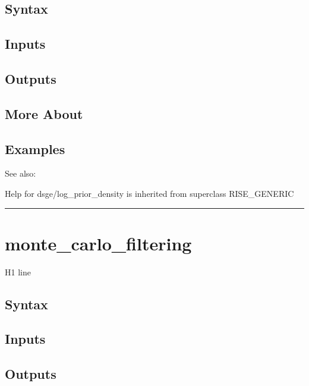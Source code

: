 \documentclass[letterpaper,10pt,english]{sphinxmanual}
\begin{document}
\subsection{Syntax}
\label{classes/models/@dsge/dsge:id105}

\subsection{Inputs}
\label{classes/models/@dsge/dsge:id106}

\subsection{Outputs}
\label{classes/models/@dsge/dsge:id107}

\subsection{More About}
\label{classes/models/@dsge/dsge:id108}

\subsection{Examples}
\label{classes/models/@dsge/dsge:id109}
See also:

Help for dsge/log\_prior\_density is inherited from superclass RISE\_GENERIC


\bigskip\hrule{}\bigskip



\section{monte\_carlo\_filtering}
\label{classes/models/@dsge/dsge:monte-carlo-filtering}\label{classes/models/@dsge/dsge:id110}
H1 line


\subsection{Syntax}
\label{classes/models/@dsge/dsge:id111}

\subsection{Inputs}
\label{classes/models/@dsge/dsge:id112}

\subsection{Outputs}
\label{classes/models/@dsge/dsge:id113}
\end{document}
